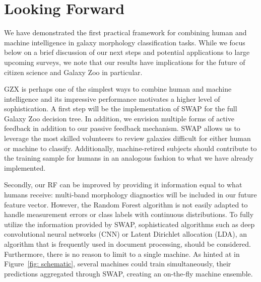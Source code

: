 \documentclass[twocolumn]{aastex6}
\begin{document}
\section{Looking Forward}\label{sec: visions}

We have demonstrated the first practical framework for combining human and machine
 intelligence in galaxy morphology classification tasks. 
While we focus below on a brief discussion of our next steps and potential applications
to large upcoming surveys, we note that our results have implications for the future
of citizen science and Galaxy Zoo in particular. 


GZX is perhaps one of the simplest ways to combine human and machine intelligence
 and its impressive performance motivates a higher level of sophistication. 
A first step will be the implementation of SWAP for the full Galaxy Zoo decision tree. 
In addition, we envision multiple forms of active feedback in addition to 
our passive feedback mechanism.  SWAP allows us to leverage the 
most skilled volunteers to review galaxies difficult for either
 human or machine to classify.  Additionally, machine-retired subjects should 
contribute to the training sample for humans in an analogous fashion to what 
we have already implemented. 

Secondly, our RF can be improved by providing it information equal to what
humans receive: multi-band morphology diagnostics will be
included in our future feature vector.  However, the Random Forest algorithm is not 
easily adapted to handle measurement errors or class labels with continuous distributions. 
To fully utilize the information provided by SWAP, sophisticated algorithms such as 
deep convolutional neural networks (CNN) or Latent Dirichlet allocation (LDA), 
an algorithm that is frequently used in document processing, should be considered.  
Furthermore, there is no reason to limit to a single machine. 
As hinted at in Figure~\ref{fig: schematic}, several machines could train simultaneously, 
their predictions aggregated through SWAP, creating an on-the-fly machine ensemble.

\end{document}
